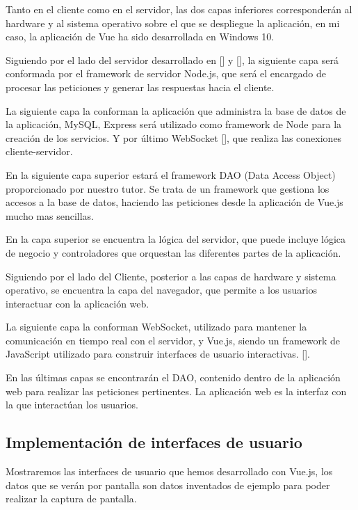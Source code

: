Tanto en el cliente como en el servidor, las dos capas inferiores corresponderán al hardware y al sistema operativo sobre el que se despliegue la aplicación, en mi caso, la aplicación de Vue ha sido desarrollada en Windows 10.

Siguiendo por el lado del servidor desarrollado en [\cite{TFG_Daniel}] y [\cite{TFG_Sergio}], la siguiente capa será conformada por el framework de servidor Node.js, que será el encargado de procesar las peticiones y generar las respuestas hacia el cliente.

La siguiente capa la conforman la aplicación que administra la base de datos de la aplicación, MySQL, Express será utilizado como framework de Node para la creación de los servicios. Y por último WebSocket [\cite{def_websocket}], que realiza las conexiones cliente-servidor.

En la siguiente capa superior estará el framework DAO (Data Access Object) proporcionado por nuestro tutor. Se trata de un framework que gestiona los accesos a la base de datos, haciendo las peticiones desde la aplicación de Vue.js mucho mas sencillas.

En la capa superior se encuentra la lógica del servidor, que puede incluye lógica de negocio y controladores que orquestan las diferentes partes de la aplicación.

Siguiendo por el lado del Cliente, posterior a las capas de hardware y sistema operativo, se encuentra la capa del navegador, que permite a los usuarios interactuar con la aplicación web.

La siguiente capa la conforman WebSocket, utilizado para mantener la comunicación en tiempo real con el servidor, y Vue.js, siendo un framework de JavaScript utilizado para construir interfaces de usuario interactivas. [\cite{def_vue}].

En las últimas capas se encontrarán el DAO, contenido dentro de la aplicación web para realizar las peticiones pertinentes. La aplicación web es la interfaz con la que interactúan los usuarios.

\subsection{Implementación de interfaces de usuario}
Mostraremos las interfaces de usuario que hemos desarrollado con Vue.js, los datos que se verán por pantalla son datos inventados de ejemplo para poder realizar la captura de pantalla.

